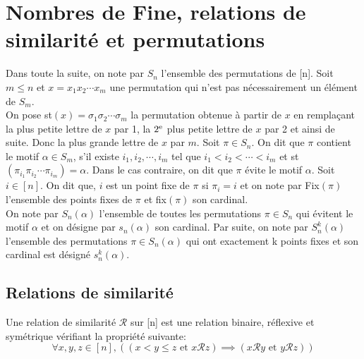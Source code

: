 \chapter{Nombres de Fine, relations de similarité et permutations}
Dans toute la suite, on note par $S_{n}$ l'ensemble des permutations de [n]. Soit $m\leq n$ et $x = x_{1}x_{2}\cdots x_{m} $ une permutation qui n'est pas nécessairement un élément de $ S_{m} $.\\ On pose st$(x) = \sigma_{1}\sigma_{2}\cdots \sigma_{m}$ la permutation obtenue à partir de $x$ en remplaçant
la plus petite lettre de $x$ par 1, la $2\textsuperscript{e}$ plus petite lettre de $x$ par 2 et ainsi
de suite. Donc la plus grande lettre de $x$ par $m$. Soit $\pi \in S_{n}$. On dit que $\pi $ contient le
motif $\alpha \in S_{m}$, s'il existe $i_{1},i_{2}, \cdots, i_{m}$ tel que $i_{1}<i_{2}< \cdots
	<i_{m}$ et st$(\pi_{i_{1}}\pi_{i_{2}}\cdots \pi_{i_{m}})=\alpha$. Dans le cas contraire, on dit que $\pi$ évite le motif $\alpha$.
Soit $i\in [n]$. On dit que, $i$ est un point fixe de $\pi$ si $\pi_{i}=i$ et on note par Fix$(\pi)$ l'ensemble des points fixes de $\pi$ et fix$(\pi)$ son cardinal.\\ On note par  $S_{n}(\alpha)$ l'ensemble
de toutes les permutations $\pi \in S_{n}$ qui évitent le motif $\alpha$ et on désigne par $s_{n}(\alpha)$ son cardinal. Par suite, on note par $S_{n}^k(\alpha)$ l'ensemble des permutations $\pi \in S_{n}(\alpha)$ qui ont exactement k points fixes et son cardinal est désigné $s_{n}^{k}(\alpha)$.
\vspace{5pt}


\section{Relations de similarité }
\begin{definition}
	\begin{rm}
		Une relation de similarité $\mathcal{R}$ sur [n] est une relation binaire, réflexive et symétrique
		vérifiant la propriété suivante:
		$$\forall x, y, z \in [n], \left((x<y\leq z \text{ et } x\mathcal{R}z) \implies
			(x\mathcal{R}y \text{ et } y\mathcal{R}z)\right) $$
	\end{rm}
\end{definition}

